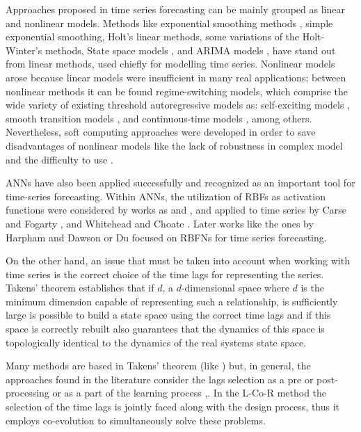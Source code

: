 \documentclass[a4paper,twoside]{article}
\newcommand{\metodo}{L-Co-R}
\begin{document}
\noindent 


Approaches proposed in time series forecasting can be mainly grouped as linear and nonlinear models. Methods like exponential smoothing methods \cite{Winters1960}, simple exponential smoothing, Holt's linear methods, some variations of the Holt-Winter's methods, State space models \cite{Snyder1985}, and ARIMA models \cite{BoxJenk}, have stand out from linear methods, used chiefly for modelling time series. Nonlinear models arose because linear models were insufficient in many real applications; between nonlinear methods it can be found regime-switching models, which comprise the wide variety of existing threshold autoregressive models \cite{Tong1978} as: self-exciting models \cite{Tong1983}, smooth transition models \cite{Chan1986}, and continuous-time models \cite{Brockwell1992157}, among others. Nevertheless, soft computing approaches were developed in order to save disadvantages of nonlinear models like the lack of robustness in complex model and the difficulty to use \cite{Clements2004}.

ANNs have also been applied successfully \cite{Jain2007}
and recognized as an important tool for time-series forecasting. 
Within ANNs, the utilization of RBFs as activation functions were
considered by works as \cite{Broomhead88} and \cite{Rivas04}, and
applied to time series by Carse and Fogarty \cite{Carse1996}, and
Whitehead and Choate \cite{Whitehead96}. Later works like the ones by
Harpham and Dawson \cite{Harpham06} or  Du \cite{Du2008} focused on
RBFNs for time series forecasting. 


On the other hand, an issue that must be taken into account when
working with time series is the correct choice of the time lags for
representing the series. Takens' theorem \cite{Takens1980} establishes
that if $d$, a $d$-dimensional space where $d$ is the minimum
dimension capable of representing such a relationship, is sufficiently
large is possible to build a state space using the correct time lags
and if this space is correctly rebuilt also guarantees that the
dynamics of this space is topologically identical to the dynamics of
the real systems state space. 

Many methods are based in Takens' theorem (like \cite{Luko2010}) but, in general, the approaches found in the literature consider the lags selection as a pre or post-processing or as a part of the learning process \cite{Araujo2010a},\cite{Maus2011}. In the {\metodo} method the selection of the time lags is jointly faced along with the design process, thus it employs co-evolution to simultaneously solve these problems.
\end{document}
